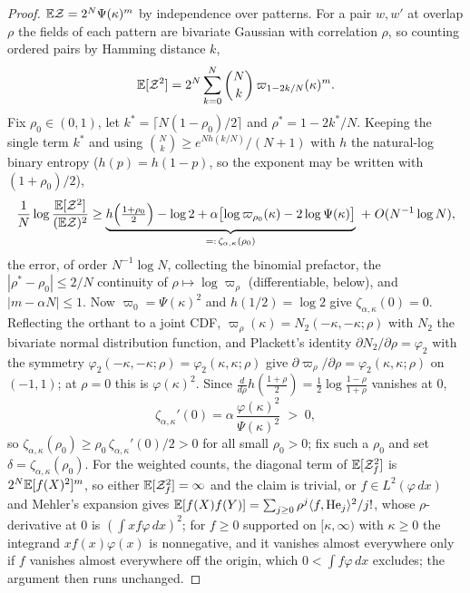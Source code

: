 \begin{proof}
$\mathbb{E} \mathcal Z=2^N\Psi(\kappa)^m$ by independence over patterns.  For a
pair $w,w'$ at overlap $\rho$ the fields of each pattern are bivariate
Gaussian with correlation $\rho$, so counting ordered pairs by
Hamming distance $k$,
\[
\mathbb{E}[\mathcal Z^2]=2^N\sum_{k=0}^N\binom Nk\,\varpi_{1-2k/N}(\kappa)^m .
\]
Fix $\rho_0\in(0,1)$, let $k^*=\lceil N(1-\rho_0)/2\rceil$ and
$\rho^*=1-2k^*/N$.  Keeping the single term $k^*$ and using
$\binom Nk\ge e^{N h(k/N)}/(N+1)$ with $h$ the natural-log binary
entropy ($h(p)=h(1-p)$, so the exponent may be written with
$(1+\rho_0)/2$),
\[
\frac1N\log\frac{\mathbb{E}[\mathcal Z^2]}{(\mathbb{E} \mathcal Z)^2}
\ge\underbrace{h\Bigl(\tfrac{1+\rho_0}2\Bigr)-\log2
+\alpha\bigl[\log \varpi_{\rho_0}(\kappa)-2\log\Psi(\kappa)\bigr]}
_{=:\,\zeta_{\alpha,\kappa}(\rho_0)}\;+\;O(N^{-1}\log N),
\]
the error, of order $N^{-1}\log N$, collecting the binomial
prefactor, the $|\rho^*-\rho_0|\le
2/N$ continuity of $\rho\mapsto\log \varpi_\rho$ (differentiable, below),
and $|m-\alpha N|\le1$.  Now $\varpi_0=\Psi(\kappa)^2$ and $h(1/2)=\log2$
give $\zeta_{\alpha,\kappa}(0)=0$.  Reflecting the orthant to a joint
CDF, $\varpi_\rho(\kappa)=N_2(-\kappa,-\kappa;\rho)$ with $N_2$ the
bivariate normal distribution function, and Plackett's
identity \cite{plackett1954} $\partial N_2/\partial\rho=\varphi_2$ with the symmetry
$\varphi_2(-\kappa,-\kappa;\rho)=\varphi_2(\kappa,\kappa;\rho)$ give
$\partial \varpi_\rho/\partial\rho=\varphi_2(\kappa,\kappa;\rho)$ on
$(-1,1)$; at $\rho=0$ this is $\varphi(\kappa)^2$.  Since
$\frac{d}{d\rho}h(\tfrac{1+\rho}2)=\tfrac12\log\tfrac{1-\rho}{1+\rho}$
vanishes at $0$,
\[
\zeta_{\alpha,\kappa}'(0)=\alpha\,
\frac{\varphi(\kappa)^2}{\Psi(\kappa)^2}\;>\;0 ,
\]
so $\zeta_{\alpha,\kappa}(\rho_0)\ge\rho_0\,\zeta_{\alpha,\kappa}'(0)/2>0$ for all
small $\rho_0>0$; fix such a $\rho_0$ and set
$\delta=\zeta_{\alpha,\kappa}(\rho_0)$.  For the weighted counts, the diagonal
term of $\mathbb{E}[\mathcal Z_f^2]$ is $2^N\mathbb{E}[f(X)^2]^m$, so either
$\mathbb{E}[\mathcal Z_f^2]=\infty$ and the claim is trivial, or $f\in L^2(\varphi\,dx)$ and
Mehler's expansion \cite{mehler1866} gives
$\mathbb{E}[f(X)f(Y)]=\sum_{j\ge0}\rho^j\langle f,\mathrm{He}_j\rangle^2/j!$,
whose $\rho$-derivative at $0$ is $(\int xf\varphi\,dx)^2$; for
$f\ge0$ supported on $[\kappa,\infty)$ with $\kappa\ge0$ the
integrand $xf(x)\varphi(x)$ is nonnegative, and it vanishes almost
everywhere only if $f$ vanishes almost everywhere off the origin,
which $0<\int f\varphi\,dx$ excludes; the argument
then runs unchanged.
\end{proof}

